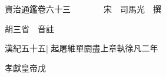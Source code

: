 






























































資治通鑑卷六十三　　　　宋　司馬光　撰

胡三省　音註

漢紀五十五|{
	起屠維單閼盡上章執徐凡二年}


孝獻皇帝戊

